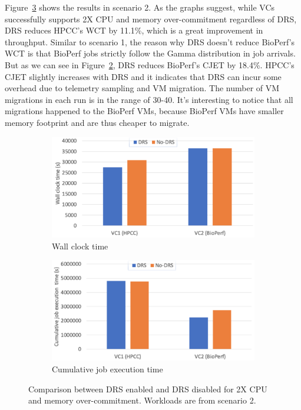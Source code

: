 Figure~\ref{fig:memory_scenario_2} shows the results in scenario 2. As the graphs suggest, while VCs successfully supports 2X CPU and memory over-commitment regardless of DRS, DRS reduces HPCC's WCT by 11.1\%, which is a great improvement in throughput. 
Similar to scenario 1, the reason why DRS doesn't reduce BioPerf's WCT is that BioPerf jobs strictly follow the Gamma distribution in job arrivals.
But as we can see in Figure~\ref{fig:memory_cjet_2}, DRS reduces BioPerf's CJET by 18.4\%.
HPCC's CJET slightly increases with DRS and it indicates that DRS can incur some overhead 
due to telemetry sampling and VM migration. 
The number of VM migrations in each run is in the range of 30-40. It's interesting to notice that all migrations happened to the BioPerf VMs, because BioPerf VMs have smaller memory footprint and are thus cheaper to migrate.

\begin{figure}
     \centering
     \begin{subfigure}[b]{0.4\textwidth}
         \centering
         \includegraphics[width=\textwidth]{Figures/memory_wct_2.pdf}
         \caption{Wall clock time}
         \label{fig:memory_wct_2}
     \end{subfigure}
     \hfill
     \begin{subfigure}[b]{0.4\textwidth}
         \centering
         \includegraphics[width=\textwidth]{Figures/memory_cjet_2.pdf}
         \caption{Cumulative job execution time}
         \label{fig:memory_cjet_2}
     \end{subfigure}
     \caption{Comparison between DRS enabled and DRS disabled for 2X CPU and memory over-commitment. Workloads are from scenario 2. }
     \label{fig:memory_scenario_2}
\end{figure}

